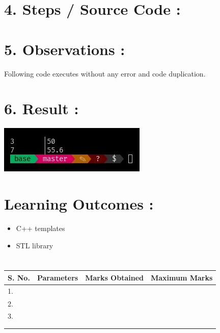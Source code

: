 \documentclass[14pt]{extarticle}
\begin{document}
\newpage
\section*{\normalsize 4. Steps / Source Code :}

     

    \vspace{1em}

\section*{\normalsize 5. Observations :}

Following code executes without any error and code duplication.

\section*{\normalsize 6. Result :}

\includegraphics{temp/output.jpeg}

\section*{\normalsize Learning Outcomes :}
    
    \begin{itemize}
      \item C++ templates
      \item STL library
    \end{itemize}

    \section*{}
\begin{center}
\begin{tabular}{ |p{2.5cm}|p{4cm}|p{5cm}|p{5cm}|} 
 \hline
 S. No. & Parameters & Marks Obtained & Maximum Marks \\
 \hline
 1.&&&\\
 \hline
 2.&&&\\
 \hline
 3.&&&\\
 \hline
 &&&\\
 &&&\\
 \hline
\end{tabular}
\end{center}
\end{document}
